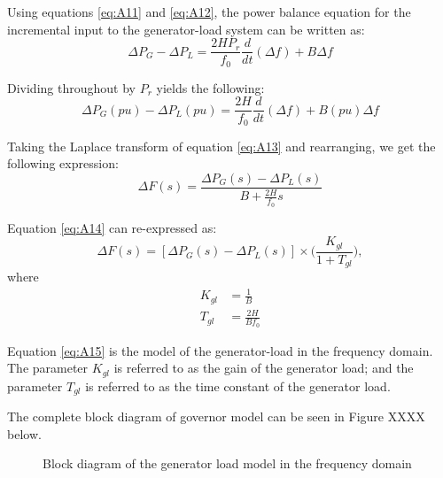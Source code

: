 Using equations \ref{eq:A11} and \ref{eq:A12}, the power balance equation for the incremental input to the generator-load system can be written as:
\begin{equation}
	\Delta P_G - \Delta P_L = \frac{2 H P_r}{f_0} \frac{d}{dt} (\Delta f) + B \Delta f
\end{equation}

Dividing throughout by $P_r$ yields the following:
\begin{equation}
	\Delta P_G(pu) - \Delta P_L(pu) = \frac{2 H}{f_0} \frac{d}{dt} (\Delta f) + B(pu) \Delta f \label{eq:A13}
\end{equation}

Taking the Laplace transform of equation \ref{eq:A13} and rearranging, we get the following expression:
\begin{equation}
	\Delta F(s) = \frac{\Delta P_G(s) - \Delta P_L(s)}{B + \frac{2H}{f_0}s} \label{eq:A14}
\end{equation}

Equation \ref{eq:A14} can re-expressed as:
\begin{equation}
	\Delta F(s) = [\Delta P_G(s) - \Delta P_L(s)] \times \bigg( \frac{K_{gl}}{1 + T_{gl}} \bigg), \label{eq:A15}
\end{equation}
where
\begin{align}
K_{gl} &= \frac{1}{B} \\
T_{gl} &= \frac{2H}{B f_0}
\end{align}

Equation \ref{eq:A15} is the model of the generator-load in the frequency domain. The parameter $K_{gl}$ is referred to as the gain of the generator load; and the parameter $T_{gl}$ is referred to as the time constant of the generator load.

The complete block diagram of governor model can be seen in Figure XXXX below.

\begin{figure}[h]
	\centering
	
	\caption[Generator-load model]{Block diagram of the generator load model in the frequency domain}
	\label{fig:A06_generator_load_model}
\end{figure}